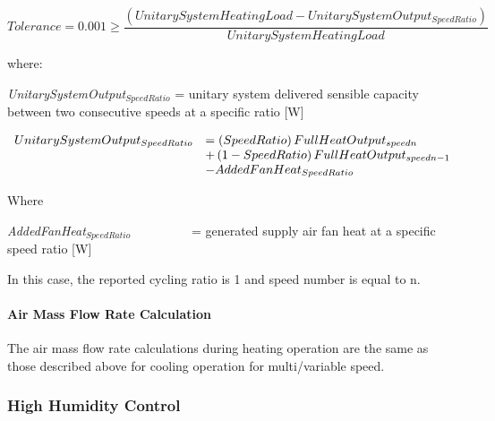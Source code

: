 \begin{equation}
Tolerance = 0.001 \ge \frac{{\left( {UnitarySystemHeatingLoad - UnitarySystemOutpu{t_{SpeedRatio}}} \right)}}{{UnitarySystemHeatingLoad}}
\end{equation}

where:

\emph{UnitarySystemOutput\(_{SpeedRatio}\)} = unitary system delivered sensible capacity between two consecutive speeds at a specific ratio {[}W{]}

\begin{equation}
  \begin{array}{rl}
    UnitarySystemOutput_{SpeedRatio} &= \left(SpeedRatio\right) FullHeatOutput_{speedn} \\
                                     &+ \left(1 - SpeedRatio\right) FullHeatOutput_{speedn - 1} \\ 
                                     &- AddedFanHeat_{SpeedRatio}
  \end{array}
\end{equation}

Where

\emph{AddedFanHeat\(_{SpeedRatio}\)}~~~~~~~~~ = generated supply air fan heat at a specific speed ratio {[}W{]}

In this case, the reported cycling ratio is 1 and speed number is equal to n.

\paragraph{Air Mass Flow Rate Calculation}\label{air-mass-flow-rate-calculation-1}

The air mass flow rate calculations during heating operation are the same as those described above for cooling operation for multi/variable speed.

\subsubsection{High Humidity Control}\label{high-humidity-control}

